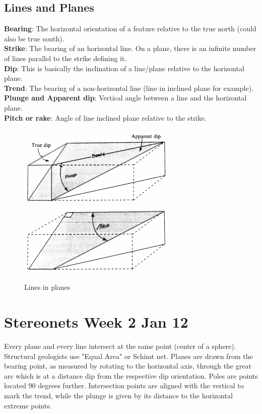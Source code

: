 \documentclass[12pt,a4paper]{report}
\begin{document}
\subsection*{Lines and Planes}
\textbf{Bearing}: The horizontal orientation of a feature relative to the true north (could also be true south).\\
\textbf{Strike}: The bearing of an horizontal line. On a plane, there is an infinite number of lines parallel to the strike defining it.\\
\textbf{Dip}: This is basically the inclination of a line/plane relative to the horizontal plane.\\
\textbf{Trend}: The bearing of a non-horizontal line (line in inclined plane for example).\\
\textbf{Plunge and Apparent dip}: Vertical angle between a line and the horizontal plane.\\
\textbf{Pitch or rake}: Angle of line inclined plane relative to the strike.\\
\begin{figure}[h]
  \includegraphics[scale=0.80]{true-dip-and-apparent-dip.png}
  \includegraphics[scale=0.80]{pitch-of-a-line.png}
  \centering
  \caption{Lines in planes}
\end{figure}

\section*{Stereonets Week 2 Jan 12}
Every plane and every line intersect at the same point (center of a sphere).
Structural geologists use "Equal Area" or Schimt net.
Planes are drawn from the bearing point, as measured by rotating to the horizontal axis, through the great arc which is at a distance dip from
the respective dip orientation. Poles are points located 90 degrees further. Intersection points are aligned with the vertical to mark the trend,
while the plunge is given by its distance to the horizontal extreme points.
\end{document}

